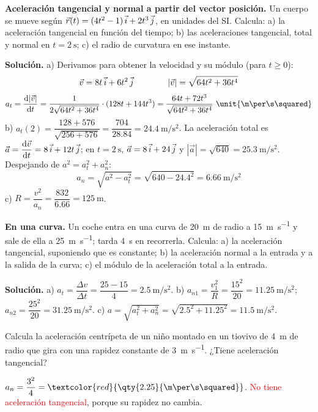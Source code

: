 \begin{example}
    \textbf{Aceleración tangencial y normal a partir del vector posición.} Un cuerpo se mueve según
    \(\vec r(t) = (4t^2 - 1)\,\vec{i} + 2t^3\,\vec{j}\), en unidades del SI. Calcula: a) la aceleración tangencial en función del
    tiempo; b) las aceleraciones tangencial, total y normal en \(t = \qty{2}{\s}\); c) el radio de curvatura en ese instante.

    \textbf{Solución.} a) Derivamos para obtener la velocidad y su módulo (para \(t \geq 0\)):
    \[ \vec v = 8t\,\vec{i} + 6t^2\,\vec{j} \qquad\qquad |\vec v| = \sqrt{64t^2 + 36t^4} \]
    \[ a_t = \frac{\dif |\vec v|}{\dif t} = \frac{1}{2\sqrt{64t^2 + 36t^4}} \cdot (128t + 144t^3) = \frac{64t + 72t^3}{\sqrt{64t^2 + 36t^4}}~\unit{\m\per\s\squared} \]
    b) \(a_t(2) = \dfrac{128 + 576}{\sqrt{256 + 576}} = \dfrac{704}{\num{28.84}} = \qty{24.4}{\m\per\s\squared}\).
    La aceleración total es \(\vec a = \dfrac{\mathrm{d}\vec v}{\mathrm{d} t} = 8\,\vec{i} + 12t\,\vec{j}\); en \(t = \qty{2}{\s}\),
    \(\vec a = 8\,\vec{i} + 24\,\vec{j}\) y \(|\vec a| = \sqrt{640} = \qty{25.3}{\m\per\s\squared}\). Despejando de
    \(a^2 = a_t^2 + a_n^2\):
    \[ a_n = \sqrt{a^2 - a_t^2} = \sqrt{640 - \num{24.4}^2} = \qty{6.66}{\m\per\s\squared} \]
    c) \(R = \dfrac{v^2}{a_n} = \dfrac{832}{\num{6.66}} = \qty{125}{\m}\).
\end{example}

\begin{example}
    \textbf{En una curva.} Un coche entra en una curva de \qty{20}{\m} de radio a \qty{15}{\m\per\s} y sale de ella a
    \qty{25}{\m\per\s}; tarda \qty{4}{\s} en recorrerla. Calcula: a) la aceleración tangencial, suponiendo que es constante; b) la
    aceleración normal a la entrada y a la salida de la curva; c) el módulo de la aceleración total a la entrada.

    \textbf{Solución.} a) \(a_t = \dfrac{\Delta v}{\Delta t} = \dfrac{25 - 15}{4} = \qty{2.5}{\m\per\s\squared}\).
    b) \(a_{n1} = \dfrac{v_1^2}{R} = \dfrac{15^2}{20} = \qty{11.25}{\m\per\s\squared}\); \(a_{n2} = \dfrac{25^2}{20} =
    \qty{31.25}{\m\per\s\squared}\). c) \(a = \sqrt{a_t^2 + a_n^2} = \sqrt{\num{2.5}^2 + \num{11.25}^2} = \qty{11.5}{\m\per\s\squared}\).
\end{example}

\begin{exercise}
    Calcula la aceleración centrípeta de un niño montado en un tiovivo de \qty{4}{\m} de radio que gira con una rapidez constante
    de \qty{3}{\m\per\s}. ¿Tiene aceleración tangencial?
    \begin{solu}
        \(a_n = \dfrac{3^2}{4} = \textcolor{red}{\qty{2.25}{\m\per\s\squared}}\). \textcolor{red}{No tiene aceleración tangencial},
        porque su rapidez no cambia.
    \end{solu}
\end{exercise}


